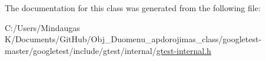 The documentation for this class was generated from the following file\+:\begin{DoxyCompactItemize}
\item 
C\+:/\+Users/\+Mindaugas K/\+Documents/\+Git\+Hub/\+Obj\+\_\+\+Duomenu\+\_\+apdorojimas\+\_\+class/googletest-\/master/googletest/include/gtest/internal/\mbox{\hyperlink{googletest-master_2googletest_2include_2gtest_2internal_2gtest-internal_8h}{gtest-\/internal.\+h}}\end{DoxyCompactItemize}
